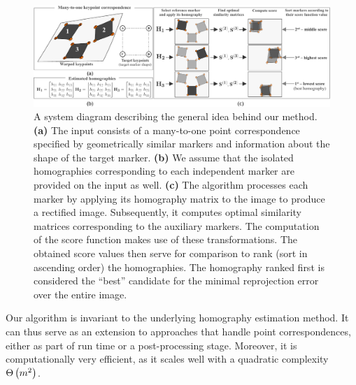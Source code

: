 \begin{figure}[t]
    \centerline{\includegraphics[width=\linewidth]{figures/methodology/system_diagram.pdf}}
    \caption[Homography ranking system diagram]{A system diagram describing the general idea behind our method. \textbf{(a)} The input consists of a many-to-one point correspondence specified by geometrically similar markers and information about the shape of the target marker. \textbf{(b)} We assume that the isolated homographies corresponding to each independent marker are provided on the input as well. \textbf{(c)} The algorithm processes each marker by applying its homography matrix to the image to produce a rectified image. Subsequently, it computes optimal similarity matrices corresponding to the auxiliary markers. The computation of the score function makes use of these transformations. The obtained score values then serve for comparison to rank (sort in ascending order) the homographies. The homography ranked first is considered the ``best'' candidate for the minimal reprojection error over the entire image.}
    \label{fig:HeatmapsBestWorst}
\end{figure}

Our algorithm is invariant to the underlying homography estimation method. It can thus serve as an extension to approaches that handle point correspondences, either as part of run time or a post-processing stage. Moreover, it is computationally very efficient, as it scales well with a quadratic complexity ${\Theta} \left( m^2 \right)$.

\def\hmatrices{\boldsymbol{\bar{H}}}
\def\scoref{\mathcal{F}}

